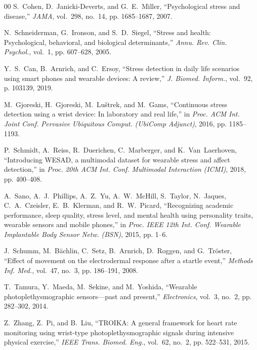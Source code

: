 \documentclass[conference]{IEEEtran}
\begin{document}
\begin{thebibliography}{00}
S.~Cohen, D.~Janicki-Deverts, and G.~E.~Miller, ``Psychological stress and disease,'' \textit{JAMA}, vol.~298, no.~14, pp. 1685--1687, 2007.

N.~Schneiderman, G.~Ironson, and S.~D.~Siegel, ``Stress and health: Psychological, behavioral, and biological determinants,'' \textit{Annu. Rev. Clin. Psychol.}, vol.~1, pp. 607--628, 2005.

Y.~S.~Can, B.~Arnrich, and C.~Ersoy, ``Stress detection in daily life scenarios using smart phones and wearable devices: A review,'' \textit{J. Biomed. Inform.}, vol.~92, p. 103139, 2019.

M.~Gjoreski, H.~Gjoreski, M.~Lu\v{s}trek, and M.~Gams, ``Continuous stress detection using a wrist device: In laboratory and real life,'' in \textit{Proc. ACM Int. Joint Conf. Pervasive Ubiquitous Comput. (UbiComp Adjunct)}, 2016, pp. 1185--1193.

P.~Schmidt, A.~Reiss, R.~Duerichen, C.~Marberger, and K.~Van~Laerhoven, ``Introducing WESAD, a multimodal dataset for wearable stress and affect detection,'' in \textit{Proc. 20th ACM Int. Conf. Multimodal Interaction (ICMI)}, 2018, pp. 400--408.

A.~Sano, A.~J.~Phillips, A.~Z.~Yu, A.~W.~McHill, S.~Taylor, N.~Jaques, C.~A.~Czeisler, E.~B.~Klerman, and R.~W.~Picard, ``Recognizing academic performance, sleep quality, stress level, and mental health using personality traits, wearable sensors and mobile phones,'' in \textit{Proc. IEEE 12th Int. Conf. Wearable Implantable Body Sensor Netw. (BSN)}, 2015, pp. 1--6.

J.~Schumm, M.~B\"achlin, C.~Setz, B.~Arnrich, D.~Roggen, and G.~Tr\"oster, ``Effect of movement on the electrodermal response after a startle event,'' \textit{Methods Inf. Med.}, vol.~47, no.~3, pp. 186--191, 2008.

T.~Tamura, Y.~Maeda, M.~Sekine, and M.~Yoshida, ``Wearable photoplethysmographic sensors---past and present,'' \textit{Electronics}, vol.~3, no.~2, pp. 282--302, 2014.

Z.~Zhang, Z.~Pi, and B.~Liu, ``TROIKA: A general framework for heart rate monitoring using wrist-type photoplethysmographic signals during intensive physical exercise,'' \textit{IEEE Trans. Biomed. Eng.}, vol.~62, no.~2, pp. 522--531, 2015.


\end{thebibliography}
\end{document}
